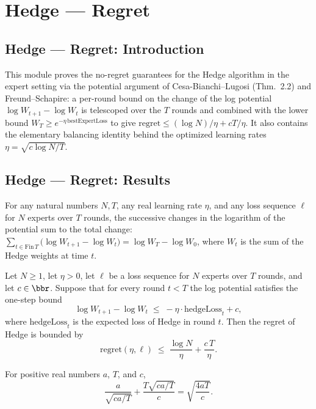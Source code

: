 \section{Hedge --- Regret}
\subsection*{Hedge --- Regret: Introduction}

This module proves the no-regret guarantees for the Hedge algorithm in the expert
setting via the potential argument of Cesa-Bianchi--Lugosi (Thm.\ 2.2) and
Freund--Schapire: a per-round bound on the change of the log potential
$\log W_{t+1} - \log W_t$ is telescoped over the $T$ rounds and combined with the lower
bound $W_T \ge e^{-\eta\,\mathrm{bestExpertLoss}}$ to give
$\mathrm{regret} \le (\log N)/\eta + cT/\eta$.  It also contains the elementary
balancing identity behind the optimized learning rates $\eta = \sqrt{c \log N / T}$.

\subsection*{Hedge --- Regret: Results}

\begin{lemma}
\label{log_potential_telescope}
\leanok
{}
For any natural numbers $N,T$, any real learning rate $\eta$, and any loss sequence
$\ell$ for $N$ experts over $T$ rounds, the successive changes in the logarithm of the
potential sum to the total change: $\sum_{t\in\mathrm{Fin}\,T}\bigl(\log W_{t+1}-\log
W_t\bigr)=\log W_T-\log W_0$, where $W_t$ is the sum of the Hedge weights at time $t$.
\end{lemma}

\begin{lemma}
\label{regret_le_of_log_potential_step}
\leanok
{}
Let $N \ge 1$, let $\eta > 0$, let $\ell$ be a loss sequence for $N$ experts over $T$
rounds, and let $c \in \bbr$.  Suppose that for every round $t < T$ the log potential
satisfies the one-step bound
\[
  \log W_{t+1} - \log W_t \;\le\; -\eta \cdot \mathrm{hedgeLoss}_t + c ,
\]
where $\mathrm{hedgeLoss}_t$ is the expected loss of Hedge in round $t$.  Then the
regret of Hedge is bounded by
\[
  \mathrm{regret}(\eta,\ell) \;\le\; \frac{\log N}{\eta} + \frac{c\,T}{\eta} .
\]
\end{lemma}

\begin{lemma}
\label{optimalEta_balance}
\leanok
{}
For positive real numbers $a$, $T$, and $c$,
\[
\frac{a}{\sqrt{ca/T}}+\frac{T\sqrt{ca/T}}{c}=\sqrt{\frac{4aT}{c}}.
\]
\end{lemma}
